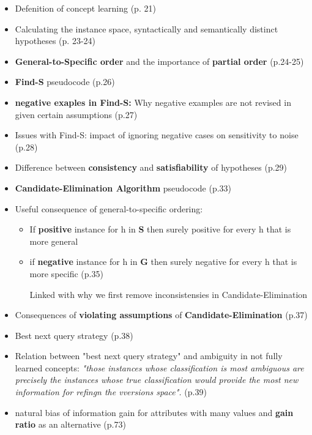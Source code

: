 \documentclass[10pt,a4paper]{article}
\begin{document}
\begin{itemize}
	\item Defenition of concept learning (p. 21)
	\item Calculating the instance space, syntactically and semantically distinct hypotheses (p. 23-24)
	\item \textbf{General-to-Specific order} and the importance of \textbf{partial order} (p.24-25)
	\item \textbf{Find-S} pseudocode (p.26)
	\item \textbf{negative exaples in Find-S:} Why negative examples are not revised in given certain assumptions (p.27)  
	\item Issues with Find-S: impact of ignoring negative cases on sensitivity to noise (p.28)
	\item Difference between \textbf{consistency} and \textbf{satisfiability } of hypotheses (p.29) 
	\item \textbf{Candidate-Elimination Algorithm} pseudocode (p.33)   
	\item Useful consequence of general-to-specific ordering:
	\begin{itemize}
		\item If \textbf{positive}  instance for h in \textbf{S} then surely positive for every h that is more general
		\item if \textbf{negative} instance for h in \textbf{G}  then surely negative for every h that is more specific (p.35)
		
		Linked with why we first remove inconsistensies in Candidate-Elimination
	\end{itemize}
	\item Consequences of \textbf{violating assumptions} of \textbf{Candidate-Elimination }  (p.37)
	\item Best next query strategy (p.38)
	\item Relation between "best next query strategy" and ambiguity in not fully learned concepts: \emph{"those instances whose classification is most ambiguous are precisely the instances whose true classification would provide the most new information for refingn the vversions space". } (p.39)
	\item natural bias of information gain for attributes with many values and \textbf{gain ratio} as an alternative (p.73) 
\end{itemize}
\end{document}
